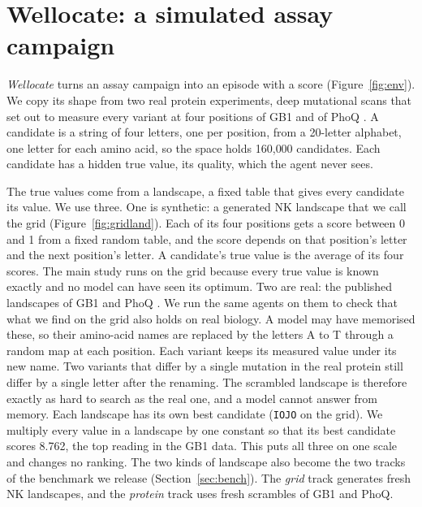 \section{Wellocate: a simulated assay campaign}
\label{sec:env}

\emph{Wellocate} turns an assay campaign into an episode with a score (Figure~\ref{fig:env}). We copy its shape
from two real protein experiments, deep mutational scans that set out to measure every variant at four positions of GB1 and of
PhoQ \citep{wu2016adaptation,podgornaia2015phoq}. A candidate is a string of four letters, one per position, from a
20-letter alphabet, one letter for each amino acid, so the space holds 160{,}000 candidates. Each candidate has a hidden
true value, its quality, which the agent never sees.

The true values come from a landscape, a fixed table that gives every candidate its value. We use three. One is
synthetic: a generated NK landscape \citep{kauffman1989nk} that we call the grid (Figure~\ref{fig:gridland}). Each of
its four positions gets a score between 0 and 1 from a fixed random table, and the score depends on that position's
letter and the next position's letter. A candidate's true value is the average of its four scores. The main study runs on the grid because every true value is known exactly and no model can
have seen its optimum. Two are real: the published landscapes of GB1 \citep{wu2016adaptation} and PhoQ \citep{podgornaia2015phoq}. We run
the same agents on them to check that what we find on the grid also holds on real biology. A model may have memorised
these, so their amino-acid names are replaced by the letters A to T through a random map at each position. Each variant keeps its
measured value under its new name. Two variants that differ by a single mutation in the real protein still
differ by a single letter after the renaming. The scrambled landscape is therefore exactly as hard to search as the real one, and a model cannot answer
from memory. Each landscape has its own best candidate (\texttt{IOJO} on the grid). We multiply every value in a
landscape by one constant so that its best candidate scores 8.762, the top reading in the GB1 data. This puts all three on one scale and changes no ranking. The two kinds of landscape also become the two
tracks of the benchmark we release (Section~\ref{sec:bench}). The \emph{grid} track generates fresh NK landscapes, and the \emph{protein} track uses fresh scrambles of GB1 and PhoQ.


